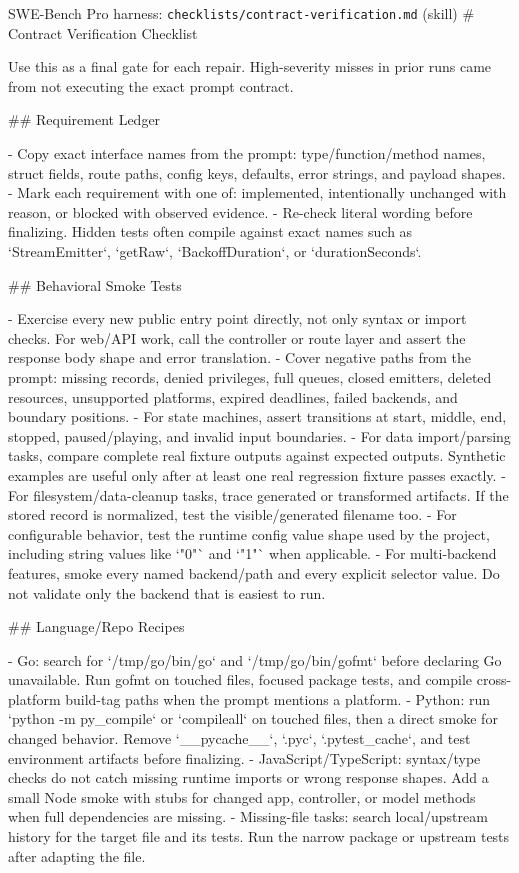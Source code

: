 \begin{promptbox}{SWE-Bench Pro harness: \texttt{checklists/contract-verification.md} (skill)}
# Contract Verification Checklist

Use this as a final gate for each repair. High-severity misses in prior runs
came from not executing the exact prompt contract.

## Requirement Ledger

- Copy exact interface names from the prompt: type/function/method names,
  struct fields, route paths, config keys, defaults, error strings, and payload
  shapes.
- Mark each requirement with one of: implemented, intentionally unchanged with
  reason, or blocked with observed evidence.
- Re-check literal wording before finalizing. Hidden tests often compile
  against exact names such as `StreamEmitter`, `getRaw`, `BackoffDuration`, or
  `durationSeconds`.

## Behavioral Smoke Tests

- Exercise every new public entry point directly, not only syntax or import
  checks. For web/API work, call the controller or route layer and assert the
  response body shape and error translation.
- Cover negative paths from the prompt: missing records, denied privileges,
  full queues, closed emitters, deleted resources, unsupported platforms,
  expired deadlines, failed backends, and boundary positions.
- For state machines, assert transitions at start, middle, end, stopped,
  paused/playing, and invalid input boundaries.
- For data import/parsing tasks, compare complete real fixture outputs against
  expected outputs. Synthetic examples are useful only after at least one real
  regression fixture passes exactly.
- For filesystem/data-cleanup tasks, trace generated or transformed artifacts.
  If the stored record is normalized, test the visible/generated filename too.
- For configurable behavior, test the runtime config value shape used by the
  project, including string values like `"0"` and `"1"` when applicable.
- For multi-backend features, smoke every named backend/path and every explicit
  selector value. Do not validate only the backend that is easiest to run.

## Language/Repo Recipes

- Go: search for `/tmp/go/bin/go` and `/tmp/go/bin/gofmt` before declaring Go
  unavailable. Run gofmt on touched files, focused package tests, and compile
  cross-platform build-tag paths when the prompt mentions a platform.
- Python: run `python -m py_compile` or `compileall` on touched files, then a
  direct smoke for changed behavior. Remove `__pycache__`, `.pyc`, `.pytest_cache`,
  and test environment artifacts before finalizing.
- JavaScript/TypeScript: syntax/type checks do not catch missing runtime imports
  or wrong response shapes. Add a small Node smoke with stubs for changed app,
  controller, or model methods when full dependencies are missing.
- Missing-file tasks: search local/upstream history for the target file and its
  tests. Run the narrow package or upstream tests after adapting the file.


\end{promptbox}
